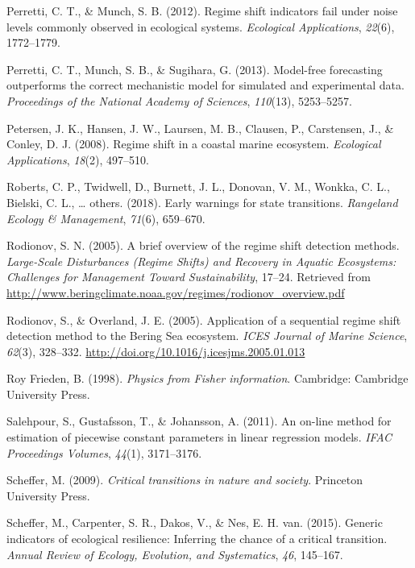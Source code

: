 \documentclass[12pt,twoside,openany]{reedthesis}
\begin{document}
\hypertarget{ref-perretti2012regime}{}
Perretti, C. T., \& Munch, S. B. (2012). Regime shift indicators fail
under noise levels commonly observed in ecological systems.
\emph{Ecological Applications}, \emph{22}(6), 1772--1779.

\hypertarget{ref-perretti_model-free_2013}{}
Perretti, C. T., Munch, S. B., \& Sugihara, G. (2013). Model-free
forecasting outperforms the correct mechanistic model for simulated and
experimental data. \emph{Proceedings of the National Academy of
Sciences}, \emph{110}(13), 5253--5257.

\hypertarget{ref-petersen2008regime}{}
Petersen, J. K., Hansen, J. W., Laursen, M. B., Clausen, P., Carstensen,
J., \& Conley, D. J. (2008). Regime shift in a coastal marine ecosystem.
\emph{Ecological Applications}, \emph{18}(2), 497--510.

\hypertarget{ref-roberts2018early}{}
Roberts, C. P., Twidwell, D., Burnett, J. L., Donovan, V. M., Wonkka, C.
L., Bielski, C. L., \ldots{} others. (2018). Early warnings for state
transitions. \emph{Rangeland Ecology \& Management}, \emph{71}(6),
659--670.

\hypertarget{ref-rodionov_brief_2005}{}
Rodionov, S. N. (2005). A brief overview of the regime shift detection
methods. \emph{Large-Scale Disturbances (Regime Shifts) and Recovery in
Aquatic Ecosystems: Challenges for Management Toward Sustainability},
17--24. Retrieved from
\url{http://www.beringclimate.noaa.gov/regimes/rodionov_overview.pdf}

\hypertarget{ref-rodionov_application_2005}{}
Rodionov, S., \& Overland, J. E. (2005). Application of a sequential
regime shift detection method to the Bering Sea ecosystem. \emph{ICES
Journal of Marine Science}, \emph{62}(3), 328--332.
\url{http://doi.org/10.1016/j.icesjms.2005.01.013}

\hypertarget{ref-roy_frieden_physics_1998}{}
Roy Frieden, B. (1998). \emph{Physics from Fisher information}.
Cambridge: Cambridge University Press.

\hypertarget{ref-salehpour2011line}{}
Salehpour, S., Gustafsson, T., \& Johansson, A. (2011). An on-line
method for estimation of piecewise constant parameters in linear
regression models. \emph{IFAC Proceedings Volumes}, \emph{44}(1),
3171--3176.

\hypertarget{ref-scheffer_critical_2009}{}
Scheffer, M. (2009). \emph{Critical transitions in nature and society}.
Princeton University Press.

\hypertarget{ref-scheffer2015generic}{}
Scheffer, M., Carpenter, S. R., Dakos, V., \& Nes, E. H. van. (2015).
Generic indicators of ecological resilience: Inferring the chance of a
critical transition. \emph{Annual Review of Ecology, Evolution, and
Systematics}, \emph{46}, 145--167.
\end{document}
